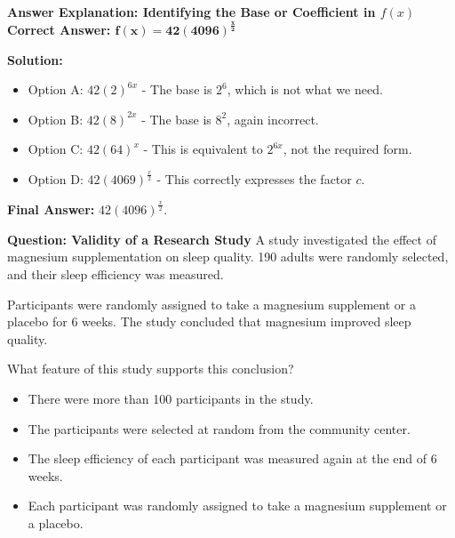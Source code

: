 \documentclass{beamer}
\begin{document}
\begin{frame}{\textbf{Answer Explanation: Identifying the Base or Coefficient in \( f(x) \)}}
    \textbf{Correct Answer: \textcolor{novelPurple}{\( \mathbf{f(x) = 42(4096)^{\frac{x}{2}}} \)}}  

    \vspace{0.3cm}
    \textbf{Solution:}
    \begin{itemize}
        \item Option A: \( 42(2)^{6x} \) - The base is \( 2^6 \), which is not what we need.
        \item Option B: \( 42(8)^{2x} \) - The base is \( 8^2 \), again incorrect.
        \item Option C: \( 42(64)^x \) - This is equivalent to \( 2^{6x} \), not the required form.
        \item Option D: \( 42(4069)^{\frac{x}{2}} \) - This correctly expresses the factor \( c \).
    \end{itemize}
    \textbf{Final Answer:} \( \boxed{42(4096)^{\frac{x}{2}}} \).
\end{frame}

\begin{frame}{\textbf{Question: Validity of a Research Study}}
    A study investigated the effect of magnesium supplementation on sleep quality.  
    190 adults were randomly selected, and their sleep efficiency was measured.  

    \vspace{0.3cm}
    Participants were randomly assigned to take a magnesium supplement or a placebo for 6 weeks.  
    The study concluded that magnesium improved sleep quality.  

    \vspace{0.5cm}
    What feature of this study supports this conclusion?

    \begin{itemize}
        \item[A.] There were more than 100 participants in the study.
        \item[B.] The participants were selected at random from the community center.
        \item[C.] The sleep efficiency of each participant was measured again at the end of 6 weeks.
        \item[D.] Each participant was randomly assigned to take a magnesium supplement or a placebo.
    \end{itemize}
\end{frame}
\end{document}
